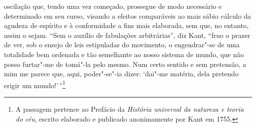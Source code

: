 oscilação que, tendo uma vez começado, prossegue de modo necessário e
determinado em seu curso, visando a efeitos comparáveis ao mais sábio
cálculo da agudeza de espírito e à conformidade a fins mais elaborada,
sem que, no entanto, assim o sejam. ``Sem o auxílio de fabulações
arbitrárias'', diz Kant, ``fruo o prazer de ver, sob o ensejo de leis
estipuladas do movimento, o engendrar"-se de uma totalidade bem ordenada
e tão semelhante ao nosso sistema de mundo, que não posso furtar"-me de
tomá"-la pelo mesmo. Num certo sentido e sem pretensão, a mim me parece
que, aqui, poder"-se"-ia dizer: `dai"-me matéria, dela pretendo erigir um
mundo!'\,''\footnote{ A passagem pertence ao Prefácio da \textit{História
universal da natureza e teoria do céu}, escrito elaborado e publicado
anonimamente por Kant em 1755.}

\sectionitem

